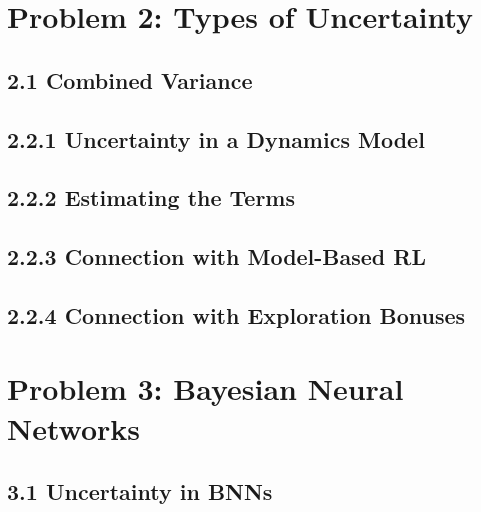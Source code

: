 \documentclass[12pt]{article}
\begin{document}
\section*{Problem 2: Types of Uncertainty}

\subsection*{2.1 Combined Variance}
\begin{solution}[height=8cm]
\end{solution}

\subsection*{2.2.1 Uncertainty in a Dynamics Model}
\begin{solution}[height=5cm]
\end{solution}

\subsection*{2.2.2 Estimating the Terms}
\begin{solution}[height=6cm]
\end{solution}

\subsection*{2.2.3 Connection with Model-Based RL}
\begin{solution}[height=6cm]
\end{solution}

\subsection*{2.2.4 Connection with Exploration Bonuses}
\begin{solution}[height=5cm]
\end{solution}

\clearpage
\section*{Problem 3: Bayesian Neural Networks}

\subsection*{3.1 Uncertainty in BNNs}
\begin{solution}[height=7cm]
\end{solution}
\end{document}
